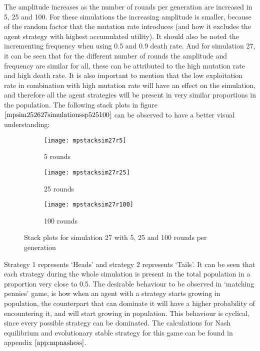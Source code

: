 The amplitude increases as the number of rounds per generation are increased in 5, 25 and 100. For these simulations the increasing amplitude is smaller, because of the random factor that the mutation rate introduces (and how it excludes the agent strategy with highest accumulated utility). It should also be noted the incrementing frequency when using 0.5 and 0.9 death rate. And for simulation 27, it can be seen that for the different number of rounds the amplitude and frequency are similar for all, these  can be attributed to the high mutation rate and high death rate. It is also important to mention that the low exploitation rate in combination with high mutation rate will have an effect on the simulation, and therefore all the agent strategies will be present in very similar proportions in the population. The following stack plots in figure $\ref{mpsim252627simulationssp525100}$  can be observed to have a better visual understanding:  

\begin{figure}[H]       
    \centering
    \begin{subfigure}[b]{0.3\textwidth}
	\centering
	{\texttt{[image: mpstacksim27r5]}}   
    	\caption{5 rounds}
	\label{fig:mpsim27sr5}
    \end{subfigure}
    \hfill
    \begin{subfigure}[b]{0.3\textwidth}
	\centering
	{\texttt{[image: mpstacksim27r25]}}   
    	\caption{25 rounds}
	\label{fig:mpsim27sr25}
    \end{subfigure}
    \hfill
    \begin{subfigure}[b]{0.3\textwidth}
	\centering
	{\texttt{[image: mpstacksim27r100]}}   
    	\caption{100 rounds}
	\label{fig:mpsim27sr100}
    \end{subfigure}
    \caption{Stack plots for simulation 27 with 5, 25 and 100 rounds per generation}
    \label{mpsim252627simulationssp525100}
\end{figure}

Strategy 1 represents `Heads' and strategy 2 represents `Tails'. It can be seen that each strategy during the whole simulation is present in the total population in a proportion very close to 0.5. The desirable behaviour to be observed in `matching pennies' game, is how when an agent with a strategy starts growing in population, the counterpart that can dominate it will have a higher probability of encountering it, and will start growing in population. This behaviour is cyclical, since every possible strategy can be dominated.
The calculations for Nash equilibrium and evolutionary stable strategy for this game can be found in appendix $\ref{app:mpnashess}$.




